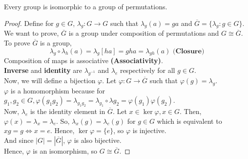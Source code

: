 \begin{theorem}
    Every group is isomorphic to a group of permutations.
\end{theorem}
\begin{proof}
    Define for $g \in G$, $\lambda_g: G \rightarrow G$ such that $\lambda_g(a) = ga$ and $\overline{G} = \{\lambda_g: g \in G\}.$ We want to prove, $\overline{G}$ is a group under composition of permutations and $G \cong \overline{G}.$
    To prove $\overline{G}$ is a group,
    \[\lambda_g \circ \lambda_h(a) = \lambda_g[ha] = gha = \lambda_{gh}(a) \textbf{ (Closure)}\]
    Composition of maps is associative \textbf{(Associativity)}.\\
    \textbf{Inverse} and \textbf{identity} are $\lambda_{g^{-1}}$ and $\lambda_e$ respectively for all $g \in G$.\\
    Now, we will define a bijection $\varphi$. Let $\varphi: G \rightarrow \overline{G}$ such that $\varphi(g) = \lambda_g$.\\
    $\varphi$ is a homomorphism because for $g_1, g_2 \in G, \varphi(g_1g_2) = \lambda_{g_1g_2} = \lambda_{g_1} \circ \lambda{g_2} = \varphi(g_1) \varphi(g_2)$.\\
    Now, $\lambda_e$ is the identity element in $\overline{G}$. Let $x \in \ker \varphi, x \in G$. Then, $\varphi(x) = \lambda_x = \lambda_e$. So, $\lambda_x(g) = \lambda_e(g)$ for $g \in G$ which is equivalent to $xg = g \Leftrightarrow x = e$. Hence, $\ker \varphi = \{e\}$, so $\varphi$ is injective.\\
    And since $|G| = |\overline{G}|$, $\varphi$ is also bijective.\\
    Hence, $\varphi$ is an isomorphism, so $G \cong \overline{G}$.
\end{proof}
